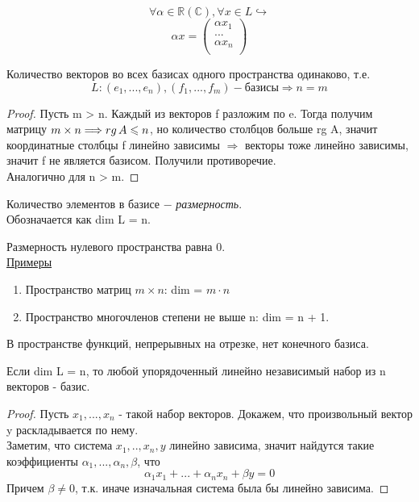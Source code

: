 \begin{theorem}
 \[\forall \alpha \in \mathbb{R} (\mathbb{C}), \forall x \in L \hookrightarrow\]
 \[
 \alpha x = 
 \begin{pmatrix}
     \alpha x_1\\
     ...\\
     \alpha x_n\\
 \end{pmatrix}
 \]
\end{theorem}

\begin{theorem}
    Количество векторов во всех базисах одного пространства одинаково, т.е.
    \[
    L : (e_1, ..., e_n), (f_1, ..., f_m) - \text{базисы} \Longrightarrow n = m
    \]
\end{theorem}
\begin{proof}
    Пусть m > n. Каждый из векторов f разложим по e. Тогда получим матрицу $m \times n \Longrightarrow rg\thinspace A \leq n$, но количество столбцов больше rg A, значит координатные столбцы f линейно зависимы $\Longrightarrow$ векторы тоже линейно зависимы, значит f не является базисом. Получили противоречие.\\

    Аналогично для n > m.
\end{proof}

\begin{definition}
    Количество элементов в базисе $-$ \textit{размерность}.\\

    Обозначается как dim L = n.
\end{definition}

Размерность нулевого пространства равна 0.\\

\underline{Примеры}
\begin{enumerate}
    \item Пространство матриц $m \times n$: dim = $m \cdot n$
    \item Пространство многочленов степени не выше n: dim = n + 1.\\
\end{enumerate}
\begin{corollary}
        В пространстве функций, непрерывных на отрезке, нет конечного базиса.
\end{corollary}
\begin{theorem}
    Если dim L = n, то любой упорядоченный линейно независимый набор из n векторов - базис.
\end{theorem}
\begin{proof}
    Пусть $x_1, ..., x_n$ - такой набор векторов. Докажем, что произвольный вектор y раскладывается по нему.\\

    Заметим, что система $x_1, .., x_n, y$ линейно зависима, значит найдутся такие коэффициенты $\alpha_1, ..., \alpha_n, \beta$, что 
    \[
    \alpha_1x_1 + ... + \alpha_nx_n + \beta y = 0
    \]
    Причем $\beta \neq 0$, т.к. иначе изначальная система была бы линейно зависима.
\end{proof}

